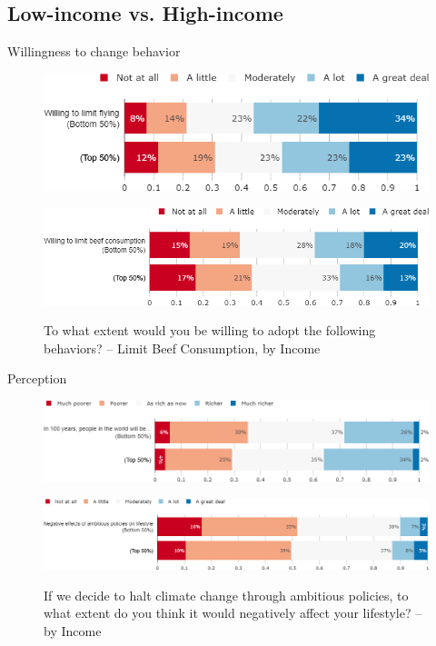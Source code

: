\documentclass[aspectratio=169,9pt,dvipsnames]{beamer}
\begin{document}
\subsection{Low-income vs. High-income}
\begin{frame}{Willingness to change behavior}%
\vspace{-.5cm}
\begin{figure}[h!]
\caption{To what extent would you be willing to adopt the following behaviors? -– Limit Flying, by Income}
\includegraphics[width=.6\textwidth]{../figures/DK/willing_limit_flying_DK_inc.png} \\
\vspace{.5cm}
\caption{To what extent would you be willing to adopt the following behaviors? -- Limit Beef Consumption, by Income}
\includegraphics[width=.7\textwidth]{../figures/DK/willing_limit_beef_DK_inc.png} \\
\end{figure}
\end{frame}

\begin{frame}{Perception}%
\vspace{-.5cm}
\begin{figure}[h!]
\caption{Do you think that overall people in the world will be richer or poorer in 100 years from now? -– by Income}
\includegraphics[width=.7\textwidth]{../figures/DK/future_richness_DK_inc.png} \\
\vspace{.5cm}
\caption{If we decide to halt climate change through ambitious policies, to what extent do you think it would negatively affect your lifestyle? -- by Income}
\includegraphics[width=.7\textwidth]{../figures/DK/effect_halt_CC_lifestyle_DK_inc.png} \\
\end{figure}
\end{frame}
\end{document}
